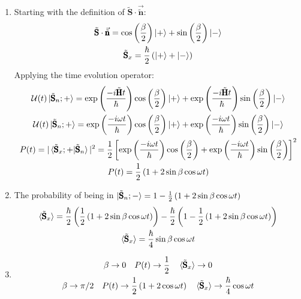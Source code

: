 \documentclass[12pt]{article}
\newcommand{\OP}[1]{\tilde{\pmb{\text{#1}}}}
\newcommand{\Fop}[1]{\mathcal{#1}}
\begin{document}
\begin{enumerate}
        \begin{enumerate}
            \item Starting with the definition of $\OP{S}\cdot\vec{\OP{n}}$:
            \begin{gather*}
                \OP{S}\cdot\vec{\OP{n}}=\cos\left( \frac{\beta}{2} \right)\ket{+}+\sin\left( \frac{\beta}{2} \right)\ket{-}\\
                \OP{S}_x=\frac{\hbar}{2}\left( \ket{+}+\ket{-} \right)\\
            \end{gather*}
            Applying the time evolution operator:
            \begin{gather*}
                \Fop{U}(t)\ket{\OP{S}_n;+}=\exp\left( \frac{-i\OP{H}t}{\hbar} \right)\cos\left( \frac{\beta}{2} \right)\ket{+}+\exp\left( \frac{-i\OP{H}t}{\hbar} \right)\sin\left( \frac{\beta}{2} \right)\ket{-}\\
                \Fop{U}(t)\ket{\OP{S}_n;+}=\exp\left( \frac{-i\omega t}{\hbar} \right)\cos\left( \frac{\beta}{2} \right)\ket{+}+\exp\left( \frac{-i\omega t}{\hbar} \right)\sin\left( \frac{\beta}{2} \right)\ket{-}\\
                P(t)=|\braket{\OP{S}_x;+|\OP{S}_n}|^2=\frac{1}{2}\left[ \exp\left( \frac{-i\omega t}{\hbar} \right)\cos\left( \frac{\beta}{2} \right)+\exp\left( \frac{-i\omega t}{\hbar} \right)\sin\left( \frac{\beta}{2} \right) \right]^2\\
                P(t)=\frac{1}{2}\left( 1+2\sin\beta\cos\omega t \right)
            \end{gather*}
            \item The probability of being in $\ket{\OP{S}_n;-}=1-\frac{1}{2}\left( 1+2\sin\beta\cos\omega t \right)$
            \begin{gather*}
                \braket{\OP{S}_x}=\frac{\hbar}{2}\left(\frac{1}{2}\left( 1+2\sin\beta\cos\omega t \right) \right)-\frac{\hbar}{2}\left( 1-\frac{1}{2}\left( 1+2\sin\beta\cos\omega t \right) \right)\\
                \braket{\OP{S}_x}=\frac{\hbar}{4}\sin\beta\cos\omega t
            \end{gather*}
            \item
            \begin{gather*}
                \beta\rightarrow0\quad P(t)\rightarrow \frac{1}{2}\quad \braket{\OP{S}_x}\rightarrow 0\\
                \beta\rightarrow\pi/2\quad P(t)\rightarrow \frac{1}{2}\left( 1+2\cos\omega t \right)\quad \braket{\OP{S}_x}\rightarrow \frac{\hbar}{4}\cos\omega t

\end{gather*}
\end{enumerate}
\end{enumerate}
\end{document}
